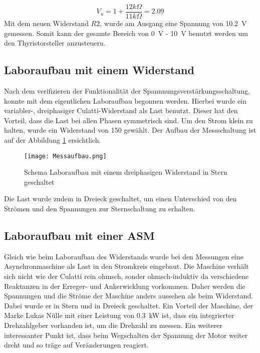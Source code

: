 \begin{equation}
V_u = 1 + \frac{12k\Omega}{11k\Omega} = 2.09
\end{equation}
Mit dem neuen Widerstand $R2$, wurde am Ausgang  eine Spannung von \SI{10.2}{V} gemessen. Somit kann der gesamte Bereich von \SI{0}{V} - \SI{10}{V} benutzt werden um den Thyristorsteller anzusteuern.

\subsection{Laboraufbau mit einem Widerstand}
Nach dem verifizieren der Funktionalität der Spannnungsverstärkungsschaltung, konnte mit dem eigentlichen Laboraufbau begonnen werden. Hierbei wurde ein variabler-, dreiphasiger Culatti-Widerstand als Last benutzt. Dieser hat den Vorteil, dass die Last bei allen Phasen symmetrisch sind. Um den Strom klein zu halten, wurde ein Widerstand von \SI{150}{\Omega} gewählt. Der Aufbau der Messschaltung ist auf der Abbildung \ref{fig:Messaufbau} ersichtlich.


\begin{figure}[ht!]
	\centering
	\texttt{[image: Messaufbau.png]}	
	\caption{Schema Laboraufbau mit einem dreiphasigen Widerstand in Stern geschaltet}\label{fig:Messaufbau}
\end{figure}

Die Last wurde zudem in Dreieck geschaltet, um einen Unterschied von den Strömen und den Spannungen zur Sternschaltung zu erhalten.

\subsection{Laboraufbau mit einer ASM}

Gleich wie beim Laboraufbau des Widerstands wurde bei den Messungen eine Asynchronmaschine als Last in den Stromkreis eingebaut. Die Maschine verhält sich nicht wie der Culatti rein ohmsch, sonder ohmsch-induktiv da verschiedene Reaktanzen in der Erreger- und Ankerwicklung vorkommen. Daher werden die Spannungen und die Ströme der Maschine anders aussehen als beim Widerstand.  Dabei wurde er in Stern und in Dreieck geschaltet. Ein Vorteil der Maschine, der Marke Lukas Nülle mit einer Leistung von \SI{0.3}{kW} ist, dass ein integrierter Drehzahlgeber vorhanden ist, um die Drehzahl zu messen. Ein weiterer interessanter Punkt ist, dass beim Wegschalten der Spannung der Motor weiter dreht und so träge auf Veränderungen reagiert.  



